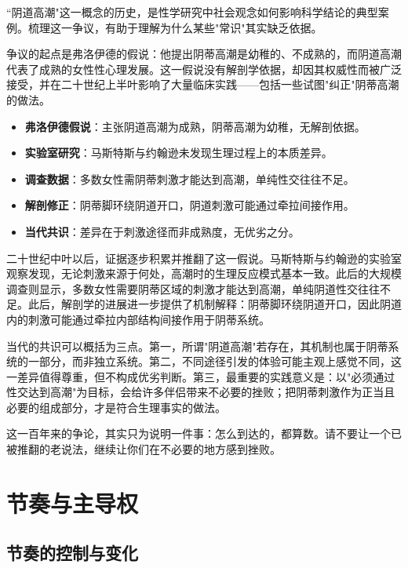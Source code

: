 \documentclass[12pt,UTF8]{ctexbook}
\newcommand{\keyword}[1]{\textbf{#1}}
\begin{document}
“阴道高潮"这一概念的历史，是性学研究中社会观念如何影响科学结论的典型案例。梳理这一争议，有助于理解为什么某些"常识"其实缺乏依据。

争议的起点是弗洛伊德的假说：他提出阴蒂高潮是幼稚的、不成熟的，而阴道高潮代表了成熟的女性性心理发展。这一假说没有解剖学依据，却因其权威性而被广泛接受，并在二十世纪上半叶影响了大量临床实践——包括一些试图"纠正"阴蒂高潮的做法。

\begin{itemize}
  \item \keyword{弗洛伊德假说}：主张阴道高潮为成熟，阴蒂高潮为幼稚，无解剖依据。
  \item \keyword{实验室研究}：马斯特斯与约翰逊未发现生理过程上的本质差异。
  \item \keyword{调查数据}：多数女性需阴蒂刺激才能达到高潮，单纯性交往往不足。
  \item \keyword{解剖修正}：阴蒂脚环绕阴道开口，阴道刺激可能通过牵拉间接作用。
  \item \keyword{当代共识}：差异在于刺激途径而非成熟度，无优劣之分。
\end{itemize}

二十世纪中叶以后，证据逐步积累并推翻了这一假说。马斯特斯与约翰逊的实验室观察发现，无论刺激来源于何处，高潮时的生理反应模式基本一致。此后的大规模调查则显示，多数女性需要阴蒂区域的刺激才能达到高潮，单纯阴道性交往往不足。此后，解剖学的进展进一步提供了机制解释：阴蒂脚环绕阴道开口，因此阴道内的刺激可能通过牵拉内部结构间接作用于阴蒂系统。

当代的共识可以概括为三点。第一，所谓"阴道高潮"若存在，其机制也属于阴蒂系统的一部分，而非独立系统。第二，不同途径引发的体验可能主观上感觉不同，这一差异值得尊重，但不构成优劣判断。第三，最重要的实践意义是：以"必须通过性交达到高潮"为目标，会给许多伴侣带来不必要的挫败；把阴蒂刺激作为正当且必要的组成部分，才是符合生理事实的做法。

\begin{tcolorbox}[colback=pink!5!white,colframe=red!50!black,title=贴心小叮咛]
这一百年来的争论，其实只为说明一件事：怎么到达的，都算数。请不要让一个已被推翻的老说法，继续让你们在不必要的地方感到挫败。
\end{tcolorbox}

\section{节奏与主导权}
\subsection{节奏的控制与变化}
\end{document}
